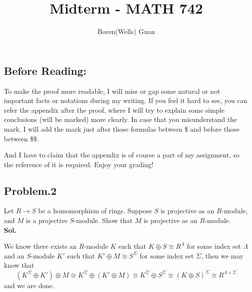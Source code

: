 \documentclass[lang=en,11pt,a4paper,citestyle =authoryear]{elegantpaper}
\title{Midterm - MATH 742}
\author{Boren(Wells) Guan}
\begin{document}
\maketitle

\subsection*{Before Reading:}\par
To make the proof more readable, I will miss or gap some natural or not important facts or notations during my writing. If you feel it hard to see, you can refer the appendix after the proof, where I will try to explain some simple conclusions (will be marked) more clearly. In case that you misunderstand the mark, I will add the mark just after those formulas between \$ and before those between \$\$.\par
And I have to claim that the appendix is of course a part of my assignment, so the reference of it is required. Enjoy your grading!

\subsection*{Problem.2} 
Let $R\to S$ be a homomorphism of rings. Suppose $S$ is projective as an $R$-module, and $M$ is a projective $S$-module. Show that $M$ is projective as an $R$-module.
\vspace{0.5em}\\
\textbf{Sol.} \par
    We know there exists an $R$-module $K$ such that $K\oplus S \cong R^{\Lambda}$ for some index set $\Lambda$ and an $S$-module $K'$ such that $K'\oplus M \cong S^{\Sigma}$ for some index set $\Sigma$, then we may know that \[(K^{\Sigma} \oplus K')\oplus M \cong K^{\Sigma} \oplus (K'\oplus M) \cong K^{\Sigma} \oplus S^{\Sigma} \cong (K\oplus S)^{\Sigma} \cong R^{\Lambda \times \Sigma}\] 
    and we are done.
\par 
\vspace{0.5em}
\end{document}
